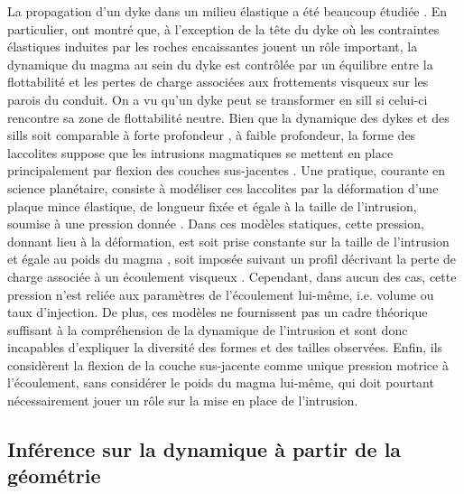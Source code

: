 La  propagation d'un  dyke dans  un  milieu élastique  a été  beaucoup
étudiée    \citep{Lister:1991ut,Rubin:1995upa}.     En    particulier,
\citet{Lister:1991ut} ont montré que, à l'exception de la tête du dyke
où  les contraintes  élastiques induites  par les  roches encaissantes
jouent un  rôle important, la dynamique  du magma au sein  du dyke est
contrôlée  par un  équilibre entre  la flottabilité  et les  pertes de
charge associées aux  frottements visqueux sur les  parois du conduit.
On a vu  qu'un dyke peut se transformer en  sill si celui-ci rencontre
sa zone de flottabilité neutre. Bien que la dynamique des dykes et des
sills       soit       comparable       à       forte       profondeur
\citep{Lister:1991ut,Cruden:tg},  à faible  profondeur,  la forme  des
laccolites suppose que les intrusions  magmatiques se mettent en place
principalement     par     flexion    des     couches     sus-jacentes
\citep{Johnson:1973ho}.  Une pratique, courante en science planétaire,
consiste à  modéliser ces laccolites  par la déformation  d'une plaque
mince  élastique,  de   longueur  fixée  et  égale  à   la  taille  de
l'intrusion,  soumise à  une  pression donnée  \citep{Pollard:1973ho}.
Dans  ces  modèles  statiques,  cette  pression,  donnant  lieu  à  la
déformation, est soit prise constante  sur la taille de l'intrusion et
égale             au             poids            du             magma
\citep{Pollard:1973ho,Wichman:1996bj,Jozwiak:2012dq},   soit   imposée
suivant  un  profil  décrivant  la  perte  de  charge  associée  à  un
écoulement visqueux \citep{Kerr:1998eo,Wohler:2009jj}. Cependant, dans
aucun  des  cas,  cette  pression   n’est  reliée  aux  paramètres  de
l’écoulement lui-même, i.e. volume ou  taux d’injection.  De plus, ces
modèles  ne  fournissent  pas  un   cadre  théorique  suffisant  à  la
compréhension de la  dynamique de l'intrusion et  sont donc incapables
d'expliquer la diversité  des formes et des  tailles observées. Enfin,
ils  considèrent la  flexion  de la  couche  sus-jacente comme  unique
pression motrice  à l'écoulement,  sans considérer  le poids  du magma
lui-même, qui doit  pourtant nécessairement jouer un rôle  sur la mise
en place de l'intrusion.

\subsection{Inférence sur la dynamique à partir de la géométrie}

\label{C1-sec:empl-dynam-des}

